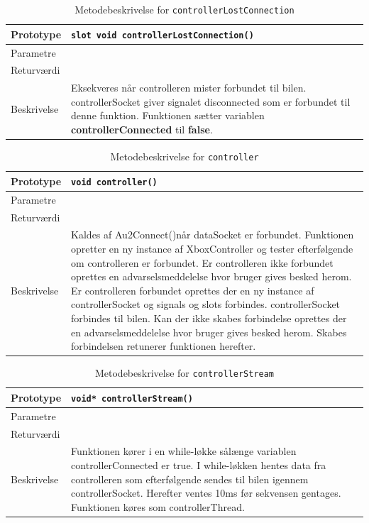 \begin{table}[H]
\begin{tabularx}{\textwidth}{| L{2.5 cm} | Z |} \hline
Prototype & \texttt{slot void controllerLostConnection()} \\\hline
Parametre &   \\\hline
Returværdi &  \\\hline
Beskrivelse & Eksekveres når controlleren mister forbundet til bilen. controllerSocket giver signalet disconnected som er forbundet til denne funktion. Funktionen sætter variablen \textbf{controllerConnected} til \textbf{false}.   \\\hline
\end{tabularx}
\caption{Metodebeskrivelse for \texttt{controllerLostConnection}}
\label{table:met_ccontrollerLostConnection}
\end{table}

\begin{table}[H]
\begin{tabularx}{\textwidth}{| L{2.5 cm} | Z |} \hline
Prototype & \texttt{void controller()} \\\hline
Parametre &   \\\hline
Returværdi &  \\\hline
Beskrivelse & Kaldes af Au2Connect()når dataSocket er forbundet. Funktionen opretter en ny instance af XboxController og tester efterfølgende om controlleren er forbundet. Er controlleren ikke forbundet oprettes en advarselsmeddelelse hvor bruger gives besked herom. Er controlleren forbundet oprettes der en ny instance af controllerSocket og signals og slots forbindes. controllerSocket forbindes til bilen. Kan der ikke skabes forbindelse oprettes der en advarselsmeddelelse hvor bruger gives besked herom. Skabes forbindelsen retunerer funktionen herefter.  \\\hline
\end{tabularx}
\caption{Metodebeskrivelse for \texttt{controller}}
\label{table:met_controller}
\end{table}

\begin{table}[H]
\begin{tabularx}{\textwidth}{| L{2.5 cm} | Z |} \hline
Prototype & \texttt{void* controllerStream()} \\\hline
Parametre &   \\\hline
Returværdi &  \\\hline
Beskrivelse & Funktionen kører i en while-løkke sålænge variablen controllerConnected er true. I while-løkken hentes data fra controlleren som efterfølgende sendes til bilen igennem controllerSocket. Herefter ventes 10ms før sekvensen gentages. Funktionen køres som controllerThread.\\\hline
\end{tabularx}
\caption{Metodebeskrivelse for \texttt{controllerStream}}
\label{table:met_controllerStream}
\end{table}

